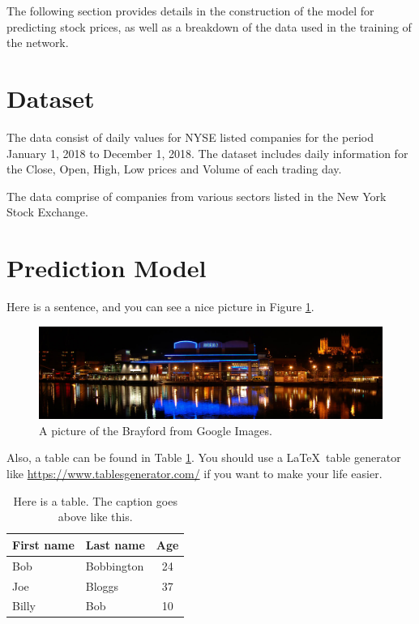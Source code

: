 The following section provides details in the construction of the model for predicting stock prices, as well as a breakdown of the data used in the training of the network.

\section{Dataset}
The data consist of daily values for NYSE listed companies for the period January 1, 2018 to December 1, 2018. The dataset includes daily information for the Close, Open, High, Low prices and Volume of each trading day. 


The data comprise of companies from various sectors listed in the New York Stock Exchange.






\section{Prediction Model}

Here is a sentence, and you can see a nice picture in Figure \ref{fig:brayford}.

\begin{figure}[h]
    \centering
    \includegraphics[width=\textwidth]{figures/brayford.jpg}
    \caption{A picture of the Brayford from Google Images.}
    \label{fig:brayford}
\end{figure}

Also, a table can be found in Table \ref{tbl:example-table}. You should use a \LaTeX~table generator like \url{https://www.tablesgenerator.com/} if you want to make your life easier.

\begin{table}[h]
    \caption{Here is a table. The caption goes above like this.}
    \centering
    \begin{tabular}{l|l|c}
        First name & Last name & Age \\
        \hline\hline
        Bob & Bobbington & 24 \\
        Joe & Bloggs & 37 \\
        Billy & Bob & 10 \\

    \end{tabular}
    \label{tbl:example-table}
\end{table}